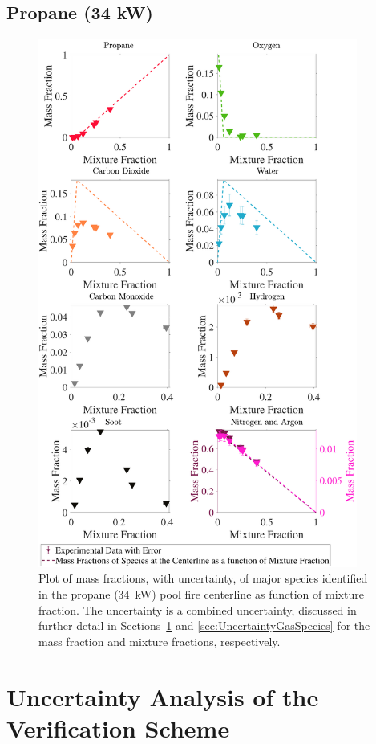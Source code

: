 \documentclass[12pt]{article}
\begin{document}
\subsection{Propane (34 kW)}
\label{ssec:Propane34KW_ALL_Mix_Frac}
\begin{figure}[!h]
	\centering
\includegraphics[width=10.5cm,keepaspectratio]{Propane 34KW_Mixture_Fraction_Major_Plot.pdf}
	\caption[Species mass fractions superimposed on propane (34~kW) state relations]{Plot of mass fractions, with uncertainty, of major species identified in the propane (34~kW) pool fire centerline as function of mixture fraction. The uncertainty is a combined uncertainty, discussed in further detail in Sections~\ref{sec:Uncertainty_Ver_Scheme} and \ref{sec:UncertaintyGasSpecies} for the mass fraction and mixture fractions, respectively.}
	\label{fig:Propane34KW_MIX_Frac_Major}
\end{figure}

\pagebreak

\section{Uncertainty Analysis of the Verification Scheme}\label{sec:Uncertainty_Ver_Scheme}
\end{document}
